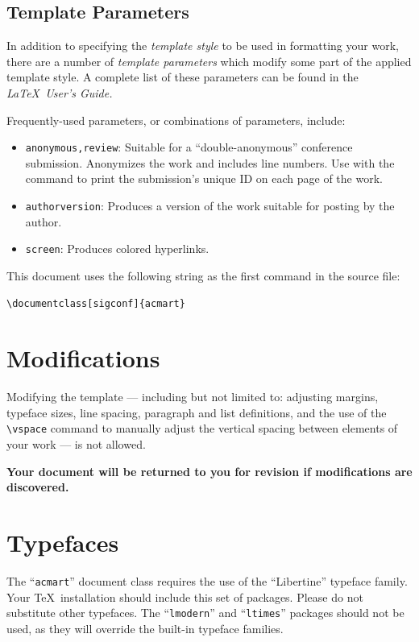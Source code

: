 \documentclass[sigconf,review]{acmart}
\begin{document}
\subsection{Template Parameters}

In addition to specifying the {\itshape template style} to be used in
formatting your work, there are a number of {\itshape template parameters}
which modify some part of the applied template style. A complete list
of these parameters can be found in the {\itshape \LaTeX\ User's Guide.}

Frequently-used parameters, or combinations of parameters, include:
\begin{itemize}
\item {\texttt{anonymous,review}}: Suitable for a ``double-anonymous''
  conference submission. Anonymizes the work and includes line
  numbers. Use with the \texttt{\string\acmSubmissionID} command to print the
  submission's unique ID on each page of the work.
\item{\texttt{authorversion}}: Produces a version of the work suitable
  for posting by the author.
\item{\texttt{screen}}: Produces colored hyperlinks.
\end{itemize}

This document uses the following string as the first command in the
source file:
\begin{verbatim}
\documentclass[sigconf]{acmart}
\end{verbatim}

\section{Modifications}

Modifying the template --- including but not limited to: adjusting
margins, typeface sizes, line spacing, paragraph and list definitions,
and the use of the \verb|\vspace| command to manually adjust the
vertical spacing between elements of your work --- is not allowed.

{\bfseries Your document will be returned to you for revision if
  modifications are discovered.}

\section{Typefaces}

The ``\verb|acmart|'' document class requires the use of the
``Libertine'' typeface family. Your \TeX\ installation should include
this set of packages. Please do not substitute other typefaces. The
``\verb|lmodern|'' and ``\verb|ltimes|'' packages should not be used,
as they will override the built-in typeface families.
\end{document}
